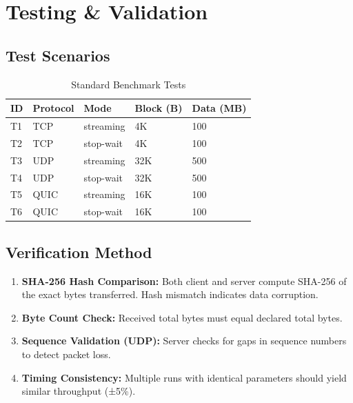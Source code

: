 \documentclass[12pt,a4paper]{article}
\begin{document}
\section{Testing \& Validation}
\label{sec:testing}

\subsection{Test Scenarios}

\begin{table}[H]
\centering
\caption{Standard Benchmark Tests}
\begin{tabular}{|l|l|l|l|l|}
\hline
\textbf{ID} & \textbf{Protocol} & \textbf{Mode} & \textbf{Block (B)} & \textbf{Data (MB)} \\
\hline
T1 & TCP & streaming & 4K & 100 \\
T2 & TCP & stop-wait & 4K & 100 \\
T3 & UDP & streaming & 32K & 500 \\
T4 & UDP & stop-wait & 32K & 500 \\
T5 & QUIC & streaming & 16K & 100 \\
T6 & QUIC & stop-wait & 16K & 100 \\
\hline
\end{tabular}
\end{table}

\subsection{Verification Method}

\begin{tcolorbox}[colback=gray!5,colframe=keycolor,title=Integrity Verification]
\begin{enumerate}
  \item \textbf{SHA-256 Hash Comparison:} Both client and server compute SHA-256 of the exact bytes transferred. Hash mismatch indicates data corruption.
  \item \textbf{Byte Count Check:} Received total bytes must equal declared total bytes.
  \item \textbf{Sequence Validation (UDP):} Server checks for gaps in sequence numbers to detect packet loss.
  \item \textbf{Timing Consistency:} Multiple runs with identical parameters should yield similar throughput (±5\%).
\end{enumerate}
\end{tcolorbox}
\end{document}
